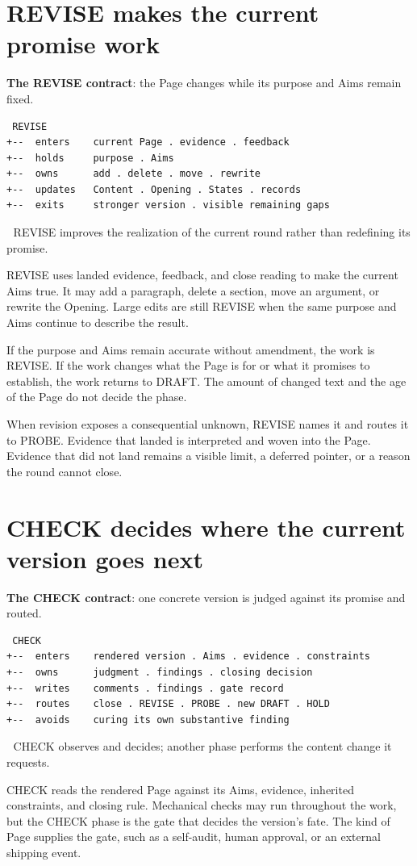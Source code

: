 \section{REVISE makes the current promise work}
\textbf{The REVISE contract}: the Page changes while its purpose and Aims remain fixed.

\begin{verbatim}
 REVISE
+--  enters    current Page . evidence . feedback
+--  holds     purpose . Aims
+--  owns      add . delete . move . rewrite
+--  updates   Content . Opening . States . records
+--  exits     stronger version . visible remaining gaps
\end{verbatim}
📌 REVISE improves the realization of the current round rather than redefining its promise.

REVISE uses landed evidence, feedback, and close reading to make the current Aims true. It may add a paragraph, delete a section, move an argument, or rewrite the Opening. Large edits are still REVISE when the same purpose and Aims continue to describe the result.

If the purpose and Aims remain accurate without amendment, the work is REVISE. If the work changes what the Page is for or what it promises to establish, the work returns to DRAFT. The amount of changed text and the age of the Page do not decide the phase.

When revision exposes a consequential unknown, REVISE names it and routes it to PROBE. Evidence that landed is interpreted and woven into the Page. Evidence that did not land remains a visible limit, a deferred pointer, or a reason the round cannot close.


\section{CHECK decides where the current version goes next}
\textbf{The CHECK contract}: one concrete version is judged against its promise and routed.

\begin{verbatim}
 CHECK
+--  enters    rendered version . Aims . evidence . constraints
+--  owns      judgment . findings . closing decision
+--  writes    comments . findings . gate record
+--  routes    close . REVISE . PROBE . new DRAFT . HOLD
+--  avoids    curing its own substantive finding
\end{verbatim}
📌 CHECK observes and decides; another phase performs the content change it requests.

CHECK reads the rendered Page against its Aims, evidence, inherited constraints, and closing rule. Mechanical checks may run throughout the work, but the CHECK phase is the gate that decides the version's fate. The kind of Page supplies the gate, such as a self-audit, human approval, or an external shipping event.

